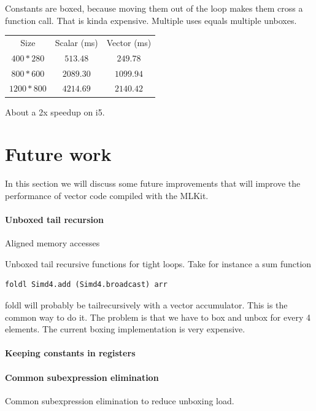 \documentclass{article}
\begin{document}
Constants are boxed, because moving them out of the loop makes them cross a function call. That is kinda expensive. Multiple uses equals multiple unboxes.


\begin{center}
\begin{tabular}{ c c c }
    Size & Scalar (ms) & Vector (ms) \\
    $400*280$ & $513.48$ & $249.78$ \\
    $800*600$ & $2089.30$ & $1099.94$ \\
    $1200*800$ & $4214.69$ & $2140.42$
\end{tabular}
\end{center}

About a 2x speedup on i5.


\section{Future work}

In this section we will discuss some future improvements that will improve the performance of vector code compiled with the MLKit.

\paragraph{Unboxed tail recursion}

Aligned memory accesses

Unboxed tail recursive functions for tight loops. Take for instance a sum function

\begin{lstlisting}
foldl Simd4.add (Simd4.broadcast) arr
\end{lstlisting}

foldl will probably be tailrecursively with a vector accumulator. This is the common way to do it. The problem is that we have to box and unbox for every 4 elements. The current boxing implementation is very expensive.

\paragraph{Keeping constants in registers}

\paragraph{Common subexpression elimination}

Common subexpression elimination to reduce unboxing load.
\end{document}
